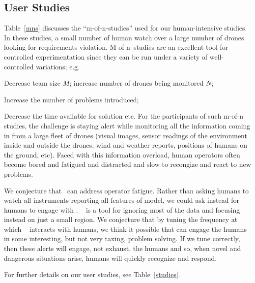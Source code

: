 \subsection{User Studies}
\noindent
Table~\ref{mns} discusses  the   ``m-of-n-studies''  used for our human-intensive studies. In these studies, a small number of human watch over a large number of drones looking for requirements violation.
\mbox{M-of-n studies}  are an excellent tool for controlled experimentation since they can  be run under a variety of well-controlled variations; e.g.
\bi
\item 
Decrease team size $M$; increase
number of drones being monitored $N$; 
\item 
Increase the number of problems introduced; 
\item 
Decrease the time available for solution etc.\ei 
For the participants of such m-of-n studies, the challenge is staying alert   while   monitoring
all the information coming in from a large fleet of drones (visual images, sensor readings of the environment
inside and outside the drones, wind and weather reports, positions of humans on the ground, etc).
Faced with this information overload,
human operators often  become bored and fatigued and  distracted and   slow to recongize and react to new problems.  
 

 We conjecture that \IT~can address   operator fatigue.
 Rather than asking humans to watch all instruments reporting all features of model,
 we could ask instead for humans to engage with 
\IT.   \IT~ is a tool
 for ignoring most of the data and focusing instead on just a small region.
 We conjecture that by  
 tuning
the   frequency at which \IT~ interacts with humans, we think it possible
that can   engage the humans in some interesting, but not very taxing, problem
solving. If we tune correctly, then
these alerts will engage, not exhaust, the humans and so,  when novel and dangerous situations arise, humans
will quickly recognize and respond.

For further details on our user studies, see Table~\ref{studies}.




